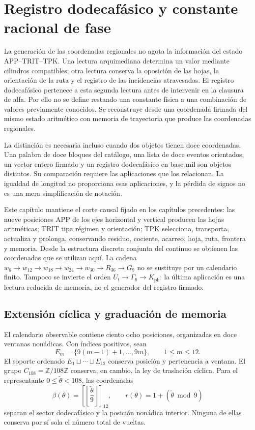 \section{Registro dodecafásico y constante racional de fase}
\label{sec:k-registro}

La generación de las coordenadas regionales no agota la información del
estado APP--TRIT--TPK. Una lectura arquimediana determina un valor mediante
cilindros compatibles; otra lectura conserva la oposición de las hojas, la
orientación de la ruta y el registro de las incidencias atravesadas. El
registro dodecafásico pertenece a esta segunda lectura antes de intervenir en
la clausura de alfa. Por ello no se define restando una constante física a
una combinación de valores previamente conocidos. Se reconstruye desde una
coordenada firmada del mismo estado aritmético con memoria de trayectoria que produce las coordenadas
regionales.

La distinción es necesaria incluso cuando dos objetos tienen doce
coordenadas. Una palabra de doce bloques del catálogo, una lista de doce
eventos orientados, un vector entero firmado y un registro dodecafásico en base mil son
objetos distintos. Su comparación requiere las aplicaciones que los
relacionan. La igualdad de longitud no proporciona esas aplicaciones, y la
pérdida de signos no es una mera simplificación de notación.

Este capítulo mantiene el corte causal fijado en los capítulos precedentes:
las nueve posiciones APP de los ejes horizontal y vertical producen las
hojas aritméticas; TRIT tipa régimen y orientación; TPK selecciona,
transporta, actualiza y prolonga, conservando residuo, cociente, acarreo,
hoja, ruta, frontera y memoria. Desde la estructura discreta conjunta del
continuo se obtienen las coordenadas que se utilizan aquí. La cadena
\(w_6\to w_{12}\to w_{18}\to w_{24}\to w_{30}\to R_{36}\to G_9\)
no se sustituye por un calendario finito. Tampoco se invierte el orden
\(U_t\to\Gamma_9\to K_{\mathrm{ph}}\): la última aplicación es una
lectura reducida de memoria, no el generador del registro firmado.



\subsection{Extensión cíclica y graduación de memoria}
\label{subsec:k-calendario}

El calendario observable contiene ciento ocho posiciones, organizadas en
doce ventanas nonádicas. Con índices positivos, sean
\[
 E_m=\{9(m-1)+1,\ldots,9m\},\qquad 1\leq m\leq12.
\]
El soporte ordenado \(E_1\sqcup\cdots\sqcup E_{12}\) conserva posición y
pertenencia a ventana. El grupo \(C_{108}=\mathbb Z/108\mathbb Z\)
conserva, en cambio, la ley de traslación cíclica. Para el representante
\(0\leq\widetilde\theta<108\), las coordenadas
\[
 \beta(\theta)=\left[\left\lfloor\frac{\widetilde\theta}{9}\right\rfloor\right]_{12},
 \qquad r(\theta)=1+(\widetilde\theta\bmod9)
\]
separan el sector dodecafásico y la posición nonádica interior. Ninguna de
ellas conserva por sí sola el número total de vueltas.

